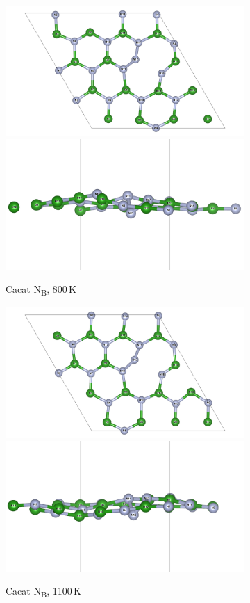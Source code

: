\begin{figure}[htbp]\ContinuedFloat
  \centering
  \begin{subfigure}{\textwidth}
    \centering
    \includegraphics[width=0.49\linewidth]{gambar_hasil/hBN_NN_800K.png}\hfill
    \includegraphics[width=0.49\linewidth]{gambar_hasil/hBN_NN_side_800K.png}
    \caption{Cacat N\textsubscript{B}, 800 K}
    \label{subfig:md_nn_800k}
  \end{subfigure}
  \vspace{1em}
  \begin{subfigure}{\textwidth}
    \centering
    \includegraphics[width=0.49\linewidth]{gambar_hasil/hBN_NN_1100K.png}\hfill
    \includegraphics[width=0.49\linewidth]{gambar_hasil/hBN_NN_side_1100K.png}
    \caption{Cacat N\textsubscript{B}, 1100 K}
    \label{subfig:md_nn_1100k}
  \end{subfigure}
  \vspace{1em}
  \begin{subfigure}{\textwidth}

\end{subfigure}
\end{figure}
